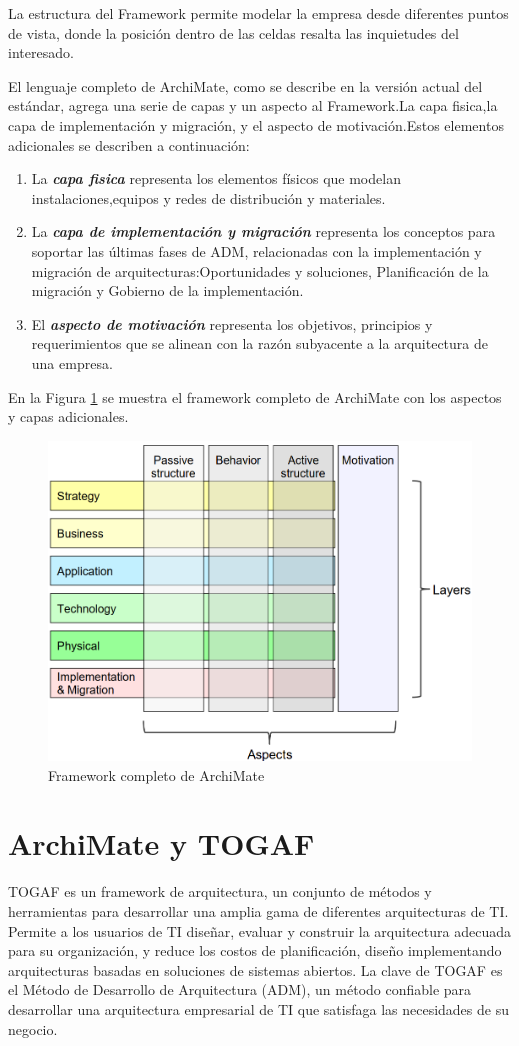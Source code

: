 La estructura del Framework permite modelar la empresa desde diferentes puntos de vista, donde la posición dentro de las celdas resalta las inquietudes del interesado.

\newpage
El lenguaje completo de ArchiMate, como se describe en la versión actual del estándar, agrega una serie de capas y un aspecto al Framework.La capa fisica,la capa de implementación y migración, y el aspecto de motivación.Estos elementos adicionales se describen a continuación: 

\begin{enumerate}
	\item La \textbf{\textit{capa fisica}}  representa los elementos físicos que modelan instalaciones,equipos y redes de distribución y materiales.
	\item La \textbf{\textit{capa de implementación y migración}} representa los conceptos para soportar las últimas fases de ADM, relacionadas con la implementación y migración de arquitecturas:Oportunidades y soluciones, Planificación de la migración y Gobierno de la implementación. 
	\item El \textbf{\textit{aspecto de motivación}} representa los  objetivos, principios y requerimientos que se alinean con la razón subyacente a la arquitectura de una empresa.
\end{enumerate}
En la Figura \ref{marco} se muestra el framework completo de ArchiMate con los aspectos y capas adicionales.

\begin{figure}[h!]
	\centering
	\includegraphics[width=0.8\linewidth]{ARQUITECTURA/imgs/marco}
	\caption{Framework completo de ArchiMate}
	\label{marco}
\end{figure}

\section{ArchiMate y TOGAF}
TOGAF es un framework de arquitectura, un conjunto de métodos y herramientas para desarrollar una amplia gama de diferentes arquitecturas de TI. Permite a los usuarios de TI diseñar, evaluar y construir la arquitectura adecuada para su organización, y reduce los costos de planificación, diseño implementando arquitecturas basadas en soluciones de sistemas abiertos. La clave de TOGAF es el Método de Desarrollo de Arquitectura (ADM), un método confiable para desarrollar una arquitectura empresarial de TI que satisfaga las necesidades de su negocio.

